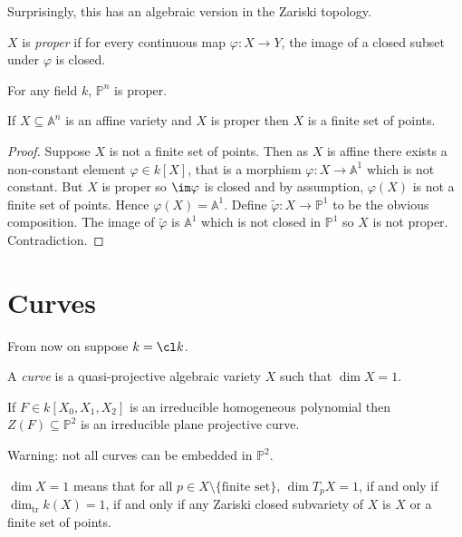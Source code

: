\documentclass[a4paper]{article}
\renewcommand{\A}{\mathbb{A}}
\renewcommand*{\P}{\mathbb{P}}
\begin{document}
Surprisingly, this has an algebraic version in the Zariski topology.

\begin{definition}[proper]
  \(X\) is \emph{proper} if for every continuous map \(\varphi: X \to Y\), the image of a closed subset under \(\varphi\) is closed.
\end{definition}

\begin{theorem}
  For any field \(k\), \(\P^n\) is proper.
\end{theorem}

\begin{corollary}
  If \(X \subseteq \A^n\) is an affine variety and \(X\) is proper then \(X\) is a finite set of points.
\end{corollary}

\begin{proof}
  Suppose \(X\) is not a finite set of points. Then as \(X\) is affine there exists a non-constant element \(\varphi \in k[X]\), that is a morphism \(\varphi: X \to \A^1\) which is not constant. But \(X\) is proper so \(\im \varphi\) is closed and by assumption, \(\varphi(X)\) is not a finite set of points. Hence \(\varphi(X) = \A^1\). Define \(\tilde \varphi: X \to \P^1\) to be the obvious composition. The image of \(\tilde \varphi\) is \(\A^1\) which is not closed in \(\P^1\) so \(X\) is not proper. Contradiction.
\end{proof}

\section{Curves}

From now on suppose \(k = \cl k\).

\begin{definition}[curve]
  A \emph{curve} is a quasi-projective algebraic variety \(X\) such that \(\dim X = 1\).
\end{definition}

\begin{eg}
  If \(F \in k[X_0, X_1, X_2]\) is an irreducible homogeneous polynomial then \(Z(F) \subseteq \P^2\) is an irreducible plane projective curve.
\end{eg}

Warning: not all curves can be embedded in \(\P^2\).

\begin{ex}
  \(\dim X = 1\) means that for all \(p \in X \setminus \{\text{finite set}\}\), \(\dim T_pX = 1\), if and only if \(\dim_{\text{tr}} k(X) = 1\), if and only if any Zariski closed subvariety of \(X\) is \(X\) or a finite set of points.
\end{ex}
\end{document}
